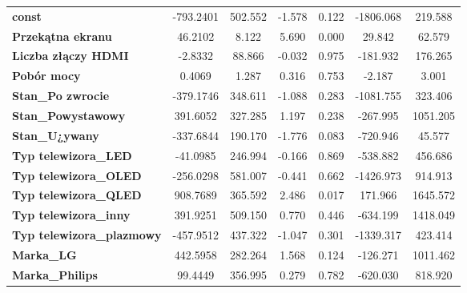 \documentclass[11pt,a4paper]{article}
\begin{document}
\begin{center}
\begin{tabular}{lcccccc}
				\textbf{const}                    &    -793.2401  &      502.552     &    -1.578  &         0.122        &    -1806.068    &      219.588     \\
				\textbf{Przekątna ekranu}         &      46.2102  &        8.122     &     5.690  &         0.000        &       29.842    &       62.579     \\
				\textbf{Liczba złączy HDMI}       &      -2.8332  &       88.866     &    -0.032  &         0.975        &     -181.932    &      176.265     \\
				\textbf{Pobór mocy}               &       0.4069  &        1.287     &     0.316  &         0.753        &       -2.187    &        3.001     \\
				\textbf{Stan\_Po zwrocie}         &    -379.1746  &      348.611     &    -1.088  &         0.283        &    -1081.755    &      323.406     \\
				\textbf{Stan\_Powystawowy}        &     391.6052  &      327.285     &     1.197  &         0.238        &     -267.995    &     1051.205     \\
				\textbf{Stan\_U¿ywany}            &    -337.6844  &      190.170     &    -1.776  &         0.083        &     -720.946    &       45.577     \\
				\textbf{Typ telewizora\_LED}      &     -41.0985  &      246.994     &    -0.166  &         0.869        &     -538.882    &      456.686     \\
				\textbf{Typ telewizora\_OLED}     &    -256.0298  &      581.007     &    -0.441  &         0.662        &    -1426.973    &      914.913     \\
				\textbf{Typ telewizora\_QLED}     &     908.7689  &      365.592     &     2.486  &         0.017        &      171.966    &     1645.572     \\
				\textbf{Typ telewizora\_inny}     &     391.9251  &      509.150     &     0.770  &         0.446        &     -634.199    &     1418.049     \\
				\textbf{Typ telewizora\_plazmowy} &    -457.9512  &      437.322     &    -1.047  &         0.301        &    -1339.317    &      423.414     \\
				\textbf{Marka\_LG}                &     442.5958  &      282.264     &     1.568  &         0.124        &     -126.271    &     1011.462     \\
				\textbf{Marka\_Philips}           &      99.4449  &      356.995     &     0.279  &         0.782        &     -620.030    &      818.920     \\

\end{tabular}
\end{center}
\end{document}
